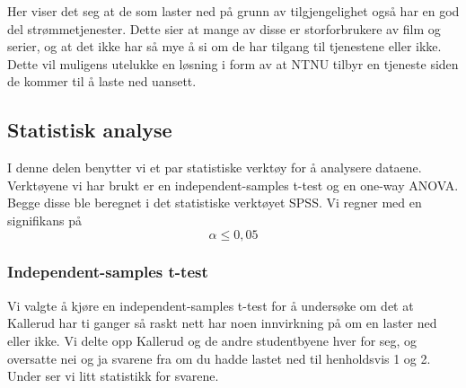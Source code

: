 Her viser det seg at de som laster ned på grunn av tilgjengelighet også har en god del strømmetjenester. Dette sier at mange av disse er storforbrukere av film og serier, og at det ikke har så mye å si om de har tilgang til tjenestene eller ikke. Dette vil muligens utelukke en løsning i form av at NTNU tilbyr en tjeneste siden de kommer til å laste ned uansett.

\subsection{Statistisk analyse}
I denne delen benytter vi et par statistiske verktøy for å analysere dataene. Verktøyene vi har brukt er en independent-samples t-test og en one-way ANOVA. Begge disse ble beregnet i det statistiske verktøyet SPSS. Vi regner med en signifikans på \[\alpha \le 0,05\]

\subsubsection{Independent-samples t-test}
Vi valgte å kjøre en independent-samples t-test for å undersøke om det at Kallerud har ti ganger så raskt nett har noen innvirkning på om en laster ned eller ikke. Vi delte opp Kallerud og de andre studentbyene hver for seg, og oversatte nei og ja svarene fra om du hadde lastet ned til henholdsvis 1 og 2. Under ser vi litt statistikk for svarene. 


